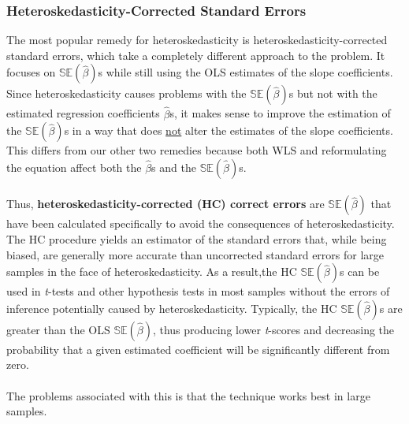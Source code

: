 \documentclass[11pt]{article}
\begin{document}
\subsubsection{Heteroskedasticity-Corrected Standard Errors}
The most popular remedy for heteroskedasticity is heteroskedasticity-corrected standard errors, which take a completely different approach to the problem. It focuses on $\mathbb{SE}(\hat{\beta})$s while still using the OLS estimates of the slope coefficients. Since heteroskedasticity causes problems with the $\mathbb{SE}(\hat{\beta})$s but not with the estimated regression coefficients $\hat{\beta}$s, it makes sense to improve the estimation of the $\mathbb{SE}(\hat{\beta})$s in a way that does \underline{not} alter the estimates of the slope coefficients. This differs from our other two remedies because both WLS and reformulating the equation affect both the $\hat{\beta}$s and the $\mathbb{SE}(\hat{\beta})$s.\\ \\
Thus, \textbf{heteroskedasticity-corrected (HC) correct errors} are $\mathbb{SE}(\hat{\beta})$ that have been calculated specifically to avoid the consequences of heteroskedasticity. The HC procedure yields an estimator of the standard errors that, while being biased, are generally more accurate than uncorrected standard errors for large samples in the face of heteroskedasticity. As a result,the HC $\mathbb{SE}(\hat{\beta})$s can be used in \textit{t}-tests and other hypothesis tests in most samples without the errors of inference potentially caused by heteroskedasticity. Typically, the HC $\mathbb{SE}(\hat{\beta})$s are greater than the OLS $\mathbb{SE}(\hat{\beta})$, thus producing lower \textit{t}-scores and decreasing the probability that a given estimated coefficient will be significantly different from zero.\\ \\
The problems associated  with this is that the technique works best in large samples.
\end{document}
